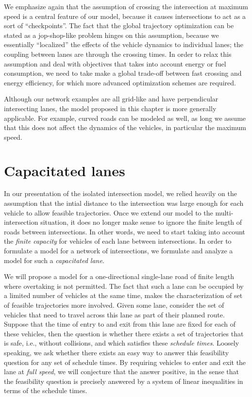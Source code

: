 \documentclass[a4paper]{report}
\theoremstyle{definition}
\theoremstyle{plain}
\begin{document}
We emphasize again that the assumption of crossing the intersection at maximum
speed is a central feature of our model, because it causes intersections to act
as a sort of ``checkpoints''.
%
The fact that the global trajectory optimization can be stated as a
jop-shop-like problem hinges on this assumption, because we essentially
``localized'' the effects of the vehicle dynamics to individual lanes; the
coupling between lanes are through the crossing times.
%
In order to relax this assumption and deal with objectives that takes into
account energy or fuel consumption, we need to take make a global trade-off
between fast crossing and energy efficiency, for which more advanced
optimization schemes are required.

Although our network examples are all grid-like and have perpendicular
intersecting lanes, the model proposed in this chapter is more generally
applicable.
%
For example, curved roads can be modeled as well, as long we assume that this
does not affect the dynamics of the vehicles, in particular the maximum speed.

\chapter{Capacitated lanes}\label{chap:capacitated-lanes}


In our presentation of the isolated intersection model, we relied heavily on the
assumption that the intial distance to the intersection was large enough for
each vehicle to allow feasible trajectories.
%
Once we extend our model to the multi-intersection situation, it does no longer
make sense to ignore the finite length of roads between intersections. In other
words, we need to start taking into account the \emph{finite capacity} for
vehicles of each lane between intersections.
%
In order to formulate a model for a network of intersections, we formulate
and analyze a model for such a \emph{capacitated lane}.

We will propose a model for a one-directional single-lane road of finite length
where overtaking is not permitted.
%
The fact that such a lane can be occupied by a limited number of vehicles at the
same time, makes the characterization of set of feasible trajectories more
involved.
%
Given some lane, consider the set of vehicles that need to travel across this
lane as part of their planned route. Suppose that the time of entry to and exit
from this lane are fixed for each of these vehicles, then the question is
whether there exists a set of trajectories that is safe, i.e., without
collisions, and which satisfies these \emph{schedule times}.
%
Loosely speaking, we ask whether there exists an easy way to answer this
feasibility question for any set of schedule times.
%
By requiring vehicles to enter and exit the lane at \emph{full speed}, we will
conjecture that the answer positive, in the sense that the feasibility question
is precisely answered by a system of linear inequalities in terms of the
schedule times.
\end{document}
